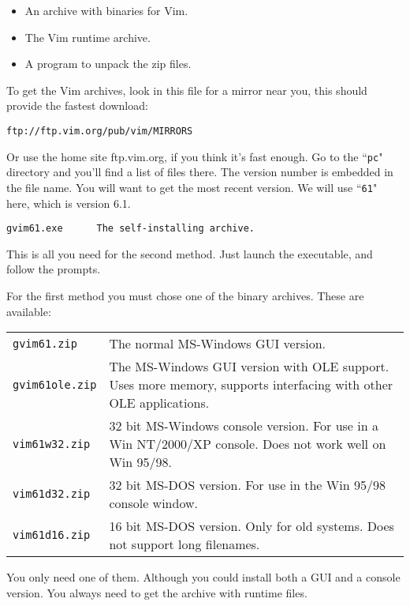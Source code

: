 \begin{itemize}
    \item An archive with binaries for Vim.
    \item The Vim runtime archive.
    \item A program to unpack the zip files.
\end{itemize}

To get the Vim archives, look in this file for a mirror near you, this should provide the fastest download:

\begin{Verbatim}[samepage=true]
    ftp://ftp.vim.org/pub/vim/MIRRORS
\end{Verbatim}

Or use the home site ftp.vim.org, if you think it's fast enough.
Go to the ``\texttt{pc}" directory and you'll find a list of files there.
The version number is embedded in the file name.
You will want to get the most recent version.
We will use ``\texttt{61}" here, which is version 6.1.

\begin{Verbatim}[samepage=true]
    gvim61.exe      The self-installing archive.
\end{Verbatim}

This is all you need for the second method.
Just launch the executable, and follow the prompts.

For the first method you must chose one of the binary archives.
These are available:

\begin{center} \begin{tabularx}{\textwidth}{l X}
				\texttt{gvim61.zip} & The normal MS-Windows GUI version. \\
				\texttt{gvim61ole.zip} & The MS-Windows GUI version with OLE support.  Uses more memory, supports interfacing with other OLE applications. \\
				\texttt{vim61w32.zip} & 32 bit MS-Windows console version.  For use in a Win NT/2000/XP console.  Does not work well on Win 95/98. \\
				\texttt{vim61d32.zip} & 32 bit MS-DOS version.  For use in the Win 95/98 console window. \\
				\texttt{vim61d16.zip} & 16 bit MS-DOS version.  Only for old systems.  Does not support long filenames. \\
\end{tabularx} \end{center}

You only need one of them.
Although you could install both a GUI and a console version.
You always need to get the archive with runtime files.

